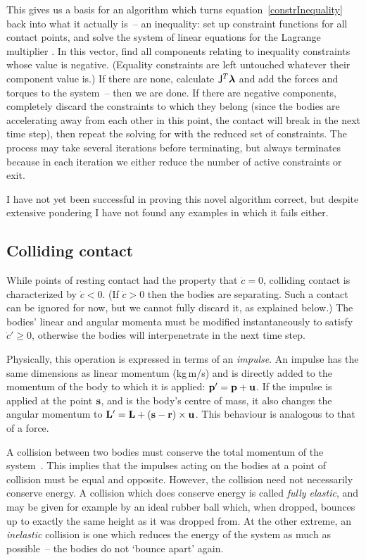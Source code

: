 This gives us a basis for an algorithm which turns equation~\ref{constrInequality} back into what
it actually is~-- an inequality: set up constraint functions for all contact points, and solve the
system of linear equations for the Lagrange multiplier \ve{\lambda}. In this vector, find all
components relating to inequality constraints whose value is negative. (Equality constraints
are left untouched whatever their \ve{\lambda} component value is.)
If there are none, calculate $\m{J}^T\ve{\lambda}$ and add the forces and torques to the system~--
then we are done. If there are negative components, completely discard the constraints to which
they belong (since the bodies are accelerating away from each other in this point, the contact
will break in the next time step), then repeat the solving for \ve{\lambda} with the reduced set
of constraints. The process may take several iterations before terminating, but always terminates
because in each iteration we either reduce the number of active constraints or exit.

I have not yet been successful in proving this novel algorithm correct, but despite extensive
pondering I have not found any examples in which it fails either.

\subsection{Colliding contact\label{collidingContact}}

While points of resting contact had the property that $\dot{c} = 0$, colliding contact is
characterized by $\dot{c} < 0$. (If $\dot{c} > 0$ then the bodies are separating.
Such a contact can be ignored for now, but we cannot fully discard it, as explained
below.) The bodies' linear and angular momenta must be modified instantaneously to satisfy
$\dot{c}' \ge 0$, otherwise the bodies will interpenetrate in the next time step.

Physically, this operation is expressed in terms of an \emph{impulse}. An impulse  has the
same dimensions as linear momentum  (kg\,m/s) and is directly added to the momentum of the
body to which it is applied: $\ve{p}' = \ve{p} + \ve{u}$. If the impulse is applied at the point
$\ve{s}$, and  is the body's centre of mass, it also changes the angular momentum to
$\ve{L}' = \ve{L} + (\ve{s} - \ve{r})\times\ve{u}$. This behaviour is analogous to that of a
force.

A collision between two bodies must conserve the total momentum of the system~\cite{Feynman:63}.
This implies that the impulses acting on the bodies at a point of collision must be equal and
opposite. However, the collision need not necessarily conserve energy. A collision which does
conserve energy is called \emph{fully elastic}, and may be given for example
by an ideal rubber ball which, when dropped, bounces up to exactly the same height as it was
dropped from. At the other extreme, an \emph{inelastic} collision is one which reduces the energy
of the system as much as possible~-- the bodies do not `bounce apart' again.


